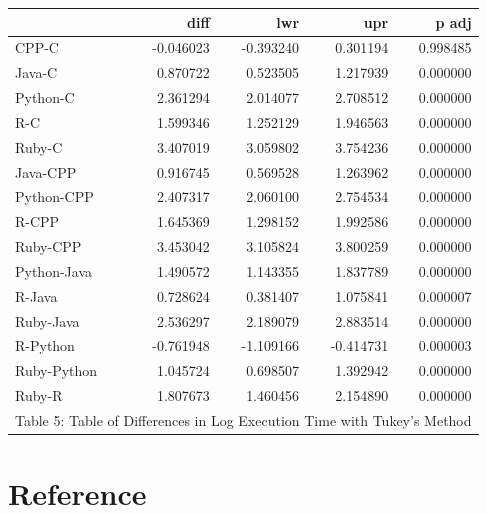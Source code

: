 \documentclass[12pt,halfline,a4paper,]{ouparticle}
\begin{document}
\begin{longtable}[t]{lrrrr}
\toprule
 & diff & lwr & upr & p adj\\
\midrule
CPP-C & -0.046023 & -0.393240 & 0.301194 & 0.998485\\
Java-C & 0.870722 & 0.523505 & 1.217939 & 0.000000\\
Python-C & 2.361294 & 2.014077 & 2.708512 & 0.000000\\
R-C & 1.599346 & 1.252129 & 1.946563 & 0.000000\\
Ruby-C & 3.407019 & 3.059802 & 3.754236 & 0.000000\\
\addlinespace
Java-CPP & 0.916745 & 0.569528 & 1.263962 & 0.000000\\
Python-CPP & 2.407317 & 2.060100 & 2.754534 & 0.000000\\
R-CPP & 1.645369 & 1.298152 & 1.992586 & 0.000000\\
Ruby-CPP & 3.453042 & 3.105824 & 3.800259 & 0.000000\\
Python-Java & 1.490572 & 1.143355 & 1.837789 & 0.000000\\
\addlinespace
R-Java & 0.728624 & 0.381407 & 1.075841 & 0.000007\\
Ruby-Java & 2.536297 & 2.189079 & 2.883514 & 0.000000\\
R-Python & -0.761948 & -1.109166 & -0.414731 & 0.000003\\
Ruby-Python & 1.045724 & 0.698507 & 1.392942 & 0.000000\\
Ruby-R & 1.807673 & 1.460456 & 2.154890 & 0.000000\\
\bottomrule
\multicolumn{5}{l}{\rule{0pt}{1em}Table 5: Table of Differences in Log Execution Time with Tukey's Method}\\
\end{longtable}
\endgroup{}

\newpage

\hypertarget{reference}{%
\section{Reference}\label{reference}}
\end{document}
